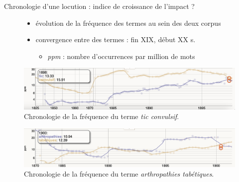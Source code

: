 \documentclass[xcolor={table,usenames,dvipsnames}]{beamer}
\let\olditem\item
\renewcommand{\item}{%
\olditem\vspace{0pt}}
\begin{document}
\begin{frame}{Chronologie d'une locution : indice de croissance de l'impact ?}
\begin{figure}[h] %
	\begin{itemize}
		\item évolution de la fréquence des termes au sein des deux corpus
		\item convergence entre des termes : fin \textsc{XIX}\ieme{}, début \textsc{XX}\ieme{} s.
		\begin{itemize}
				\item \textit{ppm} : nombre d’occurrences par million de mots 
		\end{itemize}
	\end{itemize}
	\centering
	\includegraphics[width=\linewidth]{pic/tics_convulsifs.png}
	\caption{Chronologie de la fréquence du terme \textit{tic convulsif}.}
	\label{fig:ling_out_TAL}
\end{figure}

\begin{figure}[h]
	\includegraphics[width=\linewidth]{pic/arthropathies_tabetiques.png}
\caption{Chronologie de la fréquence du terme \textit{arthropathies tabétiques}.}
\label{fig:ling_out_TAL}
\end{figure}
\end{frame}
\end{document}
